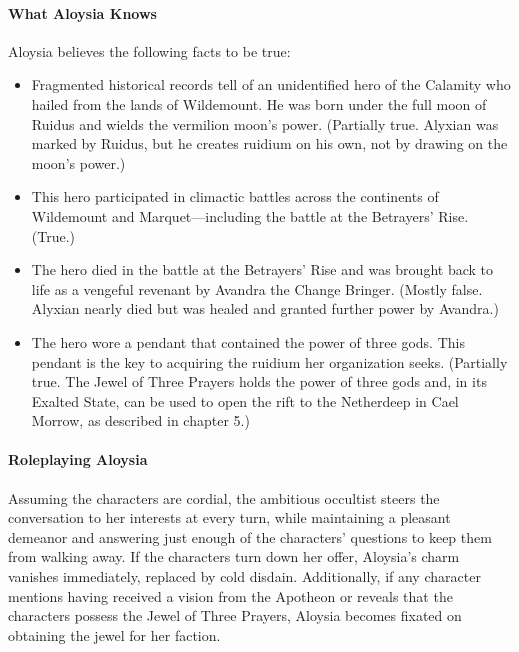 \documentclass[10pt,a4,twoside,twocolumn,openany,nodeprecatedcode]{dndbook}
\begin{document}
\paragraph{What Aloysia Knows}
Aloysia believes the following facts to be true:
\begin{itemize}

\item Fragmented historical records tell of an unidentified hero of the Calamity who hailed from the lands of Wildemount. He was born under the full moon of Ruidus and wields the vermilion moon's power. (Partially true. Alyxian was marked by Ruidus, but he creates ruidium on his own, not by drawing on the moon's power.)
\item This hero participated in climactic battles across the continents of Wildemount and Marquet—including the battle at the Betrayers' Rise. (True.)
\item The hero died in the battle at the Betrayers' Rise and was brought back to life as a vengeful revenant by Avandra the Change Bringer. (Mostly false. Alyxian nearly died but was healed and granted further power by Avandra.)
\item The hero wore a pendant that contained the power of three gods. This pendant is the key to acquiring the ruidium her organization seeks. (Partially true. The Jewel of Three Prayers holds the power of three gods and, in its Exalted State, can be used to open the rift to the Netherdeep in Cael Morrow, as described in chapter 5.)
\end{itemize}


\paragraph{Roleplaying Aloysia}
Assuming the characters are cordial, the ambitious occultist steers the conversation to her interests at every turn, while maintaining a pleasant demeanor and answering just enough of the characters' questions to keep them from walking away.
If the characters turn down her offer, Aloysia's charm vanishes immediately, replaced by cold disdain. Additionally, if any character mentions having received a vision from the Apotheon or reveals that the characters possess the Jewel of Three Prayers, Aloysia becomes fixated on obtaining the jewel for her faction.
\end{document}
